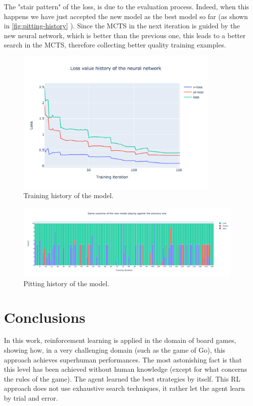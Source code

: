 \documentclass{article}
\begin{document}
The "stair pattern" of the loss, is due to the evaluation process. Indeed, when this happens we have just accepted the new model as the best model so far (as shown in \autoref{fig:pitting-history} ). Since the MCTS in the next iteration is guided by the new neural network, which is better than the previous one, this leads to a better search in the MCTS, therefore collecting better quality training examples.

\begin{figure}[H]
	\centerline{\includegraphics[width=10cm]{training_history.png}}
	\caption{Training history of the model.}
	\label{fig:training-analysis}
\end{figure}


\begin{figure}[H]
	\centerline{\includegraphics[width=\textwidth]{pitting_history.png}}
	\caption{Pitting history of the model.}
	\label{fig:pitting-history}
\end{figure}


\section{Conclusions}
In this work, reinforcement learning is applied in the domain of board games, showing how, in a very challenging domain (such as the game of Go), this approach achieves superhuman performances. The most astonishing fact is that this level has been achieved without human knowledge (except for what concerns the rules of the game). The agent learned the best strategies by itself. This RL approach does not use exhaustive search techniques, it rather let the agent learn by trial and error.
\end{document}

